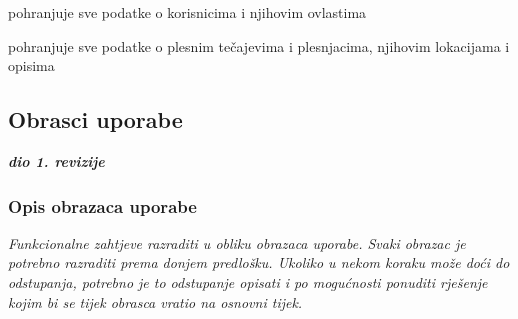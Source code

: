 \begin{packed_enum}
\begin{packed_enum}
					
				\end{packed_enum}
			
			
				\item  {}
				
				\begin{packed_enum}
					
					\item pohranjuje sve podatke o korisnicima i njihovim ovlastima
					\item pohranjuje sve podatke o plesnim tečajevima i plesnjacima, njihovim lokacijama i opisima

					
				\end{packed_enum}
			\end{packed_enum}
			
			\eject 
			
			
				
			\subsection{Obrasci uporabe}
				
				\textbf{\textit{dio 1. revizije}}
				
				\subsubsection{Opis obrazaca uporabe}
					\textit{Funkcionalne zahtjeve razraditi u obliku obrazaca uporabe. Svaki obrazac je potrebno razraditi prema donjem predlošku. Ukoliko u nekom koraku može doći do odstupanja, potrebno je to odstupanje opisati i po mogućnosti ponuditi rješenje kojim bi se tijek obrasca vratio na osnovni tijek.}\\
					
